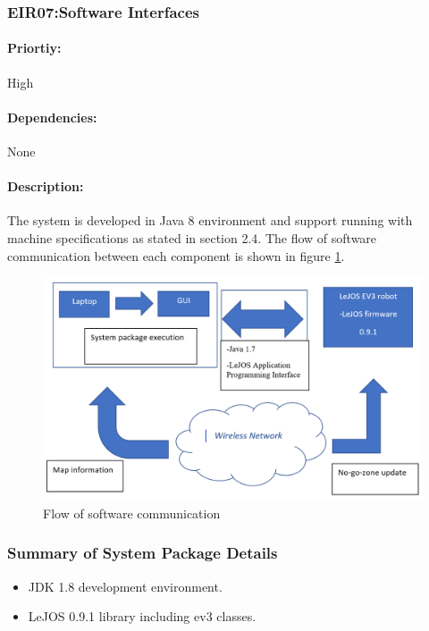 \documentclass[10pt,a4paper,titlepage]{article}
\begin{document}
	\subsubsection*{EIR07:Software Interfaces}
	\paragraph{Priortiy:} High
	\paragraph{Dependencies:} None
	\paragraph{Description:} The system is developed in Java 8 environment and support running with machine specifications as stated in section 2.4. The flow of software communication between each component is shown in figure \ref{fig:Flow of software communication}.
	
	\begin{figure}[h]
		\includegraphics[width=\linewidth]{software_interface.PNG}
		\caption{Flow of software communication}
		\label{fig:Flow of software communication}
	\end{figure}
	
	
	\subsubsection*{Summary of System Package Details}
	\begin{itemize}
	\item JDK 1.8 development environment.
	\item LeJOS 0.9.1 library including ev3 classes.
	\end{itemize}
	
\end{document}

